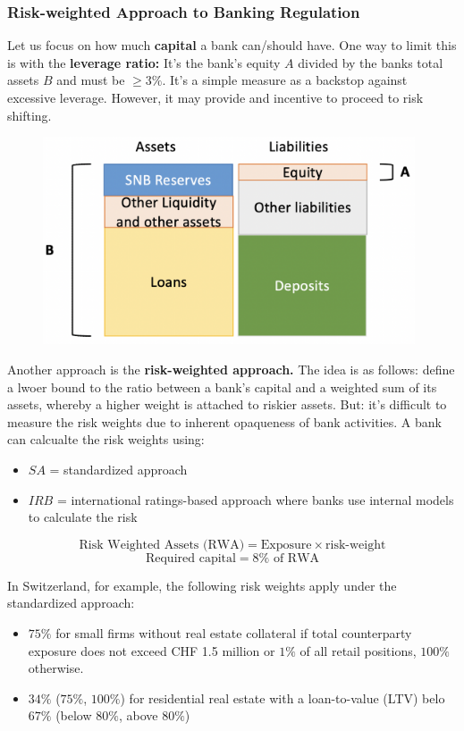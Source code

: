 \documentclass[a4paper]{extarticle}
\begin{document}
\subsubsection{Risk-weighted Approach to Banking Regulation}

Let us focus on how much \textbf{capital} a bank can/should have. One way to limit this is with the \textbf{leverage ratio:} It's the bank's equity $A$ divided by the banks total assets $B$ and must be $\geq 3 \%$. It's a simple measure as a backstop against excessive leverage. However, it may provide and incentive to proceed to risk shifting.

\begin{figure}[H]
    \includegraphics[width=11cm]{../images/EnpRisk_Fig12-4}
    \centering
\end{figure}

Another approach is the \textbf{risk-weighted approach.} The idea is as follows: define a lwoer bound to the ratio between a bank's capital and a weighted sum of its assets, whereby a higher weight is attached to riskier assets. But: it's difficult to measure the risk weights due to inherent opaqueness of bank activities. A bank can calcualte the risk weights using:

\begin{itemize}
    \item $SA$ = standardized approach
    \item $IRB$ = international ratings-based approach where banks use internal models to calculate the risk
\end{itemize}

\[
    \text{Risk Weighted Assets (RWA)} = \text{Exposure} \times \text{risk-weight}
\]
\[
    \text{Required capital} = 8\% \text{ of RWA}
\]

In Switzerland, for example, the following risk weights apply under the standardized approach:

\begin{itemize}
    \item $75\%$ for small firms without real estate collateral if total counterparty exposure does not exceed CHF 1.5 million or $1\%$ of all retail positions, $100\%$ otherwise.
    \item $34\%$ ($75\%$, $100\%$) for residential real estate with a loan-to-value (LTV) belo $67\%$ (below $80\%$, above $80\%$)
\end{itemize}
\end{document}
